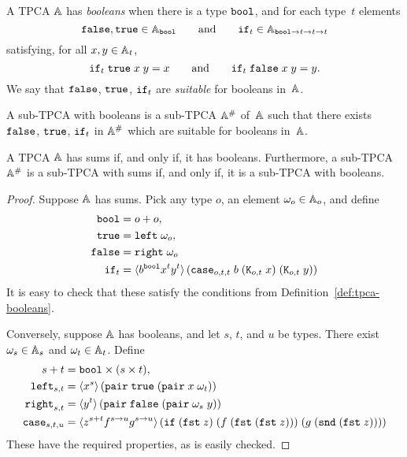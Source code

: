 \begin{definition}
  \label{def:tpca-booleans}%
  A TPCA $\AA$ has \emph{booleans} when there is a type $\ttbool$, and
  for each type~$t$ elements
  \begin{equation*}
    \combFalse, \combTrue \in \Atyp{\ttbool}
    \qquad\text{and}\qquad
    \combIf_t \in \Atyp{\ttbool \to t \to t \to t}
  \end{equation*}
  satisfying, for all $x, y \in \Atyp{t}$,
  \begin{equation*}
    \combIf_t\;\combTrue\;x\;y = x
    \qquad\text{and}\qquad
    \combIf_t\;\combFalse\;x\;y = y.
  \end{equation*}
  We say that $\combFalse$, $\combTrue$, $\combIf_t$ are
  \emph{suitable} for booleans in~$\AA$.

  A sub-TPCA with booleans is a sub-TPCA $\compAA$ of~$\AA$ such that
  there exists $\combFalse$, $\combTrue$, $\combIf_t$ in $\compAA$
  which are suitable for booleans in~$\AA$.
\end{definition}


\begin{proposition}
  \label{prop:tpca-sums-iff-booleans}
  A TPCA $\AA$ has sums if, and only if, it has booleans. Furthermore,
  a sub-TPCA~$\compAA$ is a sub-TPCA with sums if, and only if, it is
  a sub-TPCA with booleans.
\end{proposition}

\begin{proof}
  Suppose $\AA$ has sums. Pick any type $o$, an element $\omega_o \in
  \Atyp{o}$, and define
  \begin{align*}
    \ttbool &= o + o, \\
    \combTrue &= \combLeft\;\omega_o, \\
    \combFalse &= \combRight\;\omega_o \\
    \combIf_t &= \pcalam{\annot{b}{\ttbool}
                         \annot{x}{t}
                         \annot{y}{t}}
                        {\combCase_{o,t,t}\;b\;(\combK_{o,t}\;x)\;(\combK_{o,t}\;y)}
  \end{align*}
  It is easy to check that these satisfy the conditions from
  Definition~\ref{def:tpca-booleans}.

  Conversely, suppose $\AA$ has booleans, and let $s$, $t$, and $u$ be
  types. There exist $\omega_s \in \Atyp{s}$ and $\omega_t \in
  \Atyp{t}$. Define
  \begin{align*}
    s + t &= \ttbool \times (s \times t),\\
    \combLeft_{s,t} &=
    \pcalam{\annot{x}{s}}{\combPair\;\combTrue\;(\combPair\;x \; \omega_t)} \\
    \combRight_{s,t} &=
    \pcalam{\annot{y}{t}}{\combPair\;\combFalse\;(\combPair \; \omega_s \; y)} \\
    \combCase_{s,t,u} &=
    \pcalam{\annot{z}{s+t}
            \annot{f}{s \to u}
            \annot{g}{s \to u}}
    {\combIf\;(\combFst\;z)\;(f\;(\combFst\;(\combFst\;z)))\;(g\;(\combSnd\;(\combFst\;z)))}
  \end{align*}
  These have the required properties, as is easily checked.
\end{proof}

